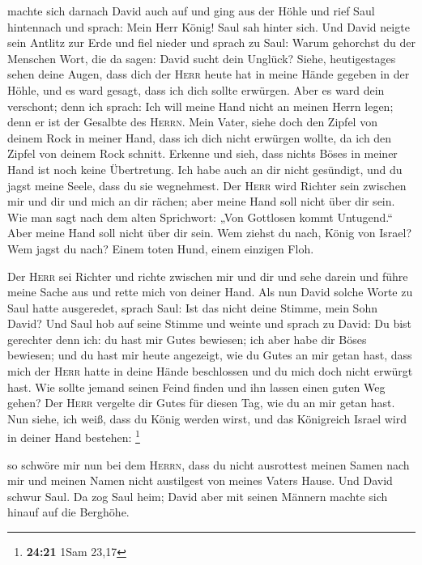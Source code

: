  machte sich darnach David auch auf und ging aus der Höhle
und rief Saul hintennach und sprach: Mein Herr König! Saul sah hinter
sich. Und David neigte sein Antlitz zur Erde und fiel nieder
 und sprach zu Saul: Warum gehorchst du der Menschen
Wort, die da sagen: David sucht dein Unglück?  Siehe,
heutigestages sehen deine Augen, dass dich der \textsc{Herr} heute hat
in meine Hände gegeben in der Höhle, und es ward gesagt, dass ich dich
sollte erwürgen. Aber es ward dein verschont; denn ich sprach: Ich will
meine Hand nicht an meinen Herrn legen; denn er ist der Gesalbte des
\textsc{Herrn}.  Mein Vater, siehe doch den Zipfel von
deinem Rock in meiner Hand, dass ich dich nicht erwürgen wollte, da ich
den Zipfel von deinem Rock schnitt. Erkenne und sieh, dass nichts Böses
in meiner Hand ist noch keine Übertretung. Ich habe auch an dir nicht
gesündigt, und du jagst meine Seele, dass du sie wegnehmest.
 Der \textsc{Herr} wird Richter sein zwischen mir und dir
und mich an dir rächen; aber meine Hand soll nicht über dir sein.
 Wie man sagt nach dem alten Sprichwort: „Von Gottlosen
kommt Untugend.`` Aber meine Hand soll nicht über dir sein.
 Wem ziehst du nach, König von Israel? Wem jagst du nach?
Einem toten Hund, einem einzigen Floh.

 Der \textsc{Herr} sei Richter und richte zwischen mir
und dir und sehe darein und führe meine Sache aus und rette mich von
deiner Hand.  Als nun David solche Worte zu Saul hatte
ausgeredet, sprach Saul: Ist das nicht deine Stimme, mein Sohn David?
Und Saul hob auf seine Stimme und weinte  und sprach zu
David: Du bist gerechter denn ich: du hast mir Gutes bewiesen; ich aber
habe dir Böses bewiesen;  und du hast mir heute
angezeigt, wie du Gutes an mir getan hast, dass mich der \textsc{Herr}
hatte in deine Hände beschlossen und du mich doch nicht erwürgt hast.
 Wie sollte jemand seinen Feind finden und ihn lassen
einen guten Weg gehen? Der \textsc{Herr} vergelte dir Gutes für diesen
Tag, wie du an mir getan hast.  Nun siehe, ich weiß, dass
du König werden wirst, und das Königreich Israel wird in deiner Hand
bestehen: \footnote{\textbf{24:21} 1Sam 23,17}

 so schwöre mir nun bei dem \textsc{Herrn}, dass du nicht
ausrottest meinen Samen nach mir und meinen Namen nicht austilgest von
meines Vaters Hause.  Und David schwur Saul. Da zog Saul
heim; David aber mit seinen Männern machte sich hinauf auf die Berghöhe.

